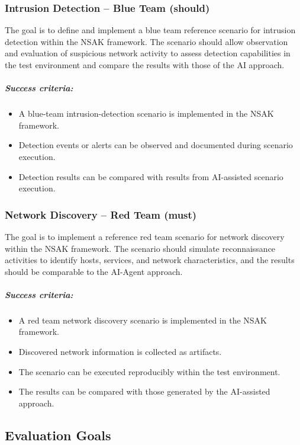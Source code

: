 \subsubsection{Intrusion Detection -- Blue Team (should)}

The goal is to define and implement a blue team reference scenario for intrusion detection within the NSAK framework. The scenario should allow observation and evaluation of suspicious network activity to assess detection capabilities in the test environment and compare the results with those of the AI approach.

\subparagraph{Success criteria:}

\begin{itemize}
	\item A blue-team intrusion-detection scenario is implemented in the NSAK framework.
	\item Detection events or alerts can be observed and documented during scenario execution.
	\item Detection results can be compared with results from AI-assisted scenario execution.
\end{itemize}

\subsubsection{Network Discovery -- Red Team (must)}

The goal is to implement a reference red team scenario for network discovery within the NSAK framework. The scenario should simulate reconnaissance activities to identify hosts, services, and network characteristics, and the results should be comparable to the AI-Agent approach.

\subparagraph{Success criteria:}

\begin{itemize}
	\item A red team network discovery scenario is implemented in the NSAK framework.
	\item Discovered network information is collected as artifacts.
	\item The scenario can be executed reproducibly within the test environment.
	\item The results can be compared with those generated by the AI-assisted approach.
\end{itemize}
\newpage

\subsection{Evaluation Goals}

